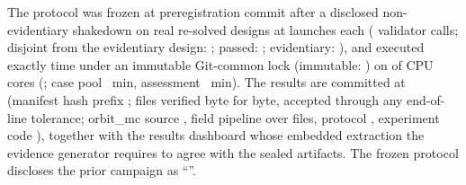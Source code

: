 The protocol was frozen at preregistration commit \texttt{\WlgPreregCommit} after a
disclosed non-evidentiary shakedown on \WlgShakedownDesigns{} real re-solved designs
at \WlgShakedownLaunches{} launches each (\WlgShakedownValidators{} validator calls;
disjoint from the evidentiary design: \WlgShakedownDisjoint; passed:
\WlgShakedownPassed; evidentiary: \WlgShakedownEvidentiary), and executed exactly
\WlgAttemptCount{} time under an immutable Git-common lock (immutable:
\WlgLockImmutable) on \WlgWorkerPool{} of \WlgCpuCount{} CPU cores
(\texttt{\WlgDevice}; case pool \WlgCasesWallMin{}~min, assessment
\WlgAssessmentWallMin{}~min). The results are committed at
\texttt{\WlgResultsCommit} (manifest hash prefix \texttt{\WlgManifestSha};
\WlgVerifiedFiles{} files verified byte for byte, \WlgToleratedEolFiles{} accepted
through any end-of-line tolerance; orbit\_mc source \texttt{\WlgOrbitMcSourceSha},
field pipeline \texttt{\WlgFieldPipelineSha} over \WlgFieldPipelineFiles{} files,
protocol \texttt{\WlgProtocolSha}, experiment code \texttt{\WlgExperimentCodeSha}),
together with the results dashboard whose embedded extraction the evidence
generator requires to agree with the sealed artifacts. The frozen protocol
discloses the prior campaign as ``\WlgVFourHeadline''.

